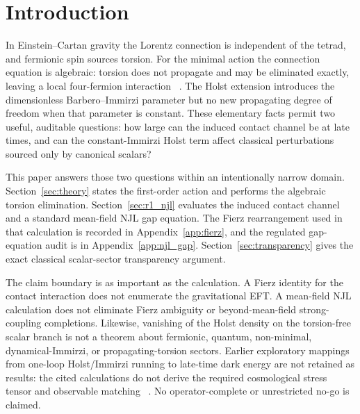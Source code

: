 \documentclass[aps,prd,twocolumn,superscriptaddress,showpacs,preprintnumbers,nofootinbib,longbibliography,floatfix]{revtex4-2}
\begin{document}

\maketitle
\tableofcontents


\section{Introduction}\label{sec:intro}

In Einstein--Cartan gravity the Lorentz connection is independent of the
tetrad, and fermionic spin sources torsion.  For the minimal action the
connection equation is algebraic: torsion does not propagate and may be
eliminated exactly, leaving a local four-fermion interaction
~\cite{Hehl1976,HehlDattaNJL1971,Freidel2005}.  The Holst extension introduces
the dimensionless Barbero--Immirzi parameter but no new propagating degree of
freedom when that parameter is constant.  These elementary facts permit two
useful, auditable questions: how large can the induced contact channel be at
late times, and can the constant-Immirzi Holst term affect classical
perturbations sourced only by canonical scalars?

This paper answers those two questions within an intentionally narrow domain.
Section~\ref{sec:theory} states the first-order action and performs the
algebraic torsion elimination.  Section~\ref{sec:r1_njl} evaluates the induced
contact channel and a standard mean-field NJL gap equation.  The Fierz
rearrangement used in that calculation is recorded in
Appendix~\ref{app:fierz}, and the regulated gap-equation audit is in
Appendix~\ref{app:njl_gap}.  Section~\ref{sec:transparency} gives the exact
classical scalar-sector transparency argument.

The claim boundary is as important as the calculation.  A Fierz identity for
the contact interaction does not enumerate the gravitational EFT.  A
mean-field NJL calculation does not eliminate Fierz ambiguity or
beyond-mean-field strong-coupling completions.  Likewise, vanishing of the
Holst density on the torsion-free scalar branch is not a theorem about
fermionic, quantum, non-minimal, dynamical-Immirzi, or propagating-torsion
sectors.  Earlier exploratory mappings from one-loop Holst/Immirzi running to
late-time dark energy are not retained as results: the cited calculations do
not derive the required cosmological stress tensor and observable matching
~\cite{ShapiroTeixeira2014,BenedettiSpeziale2011run}.  No operator-complete or
unrestricted no-go is claimed.
\end{document}

